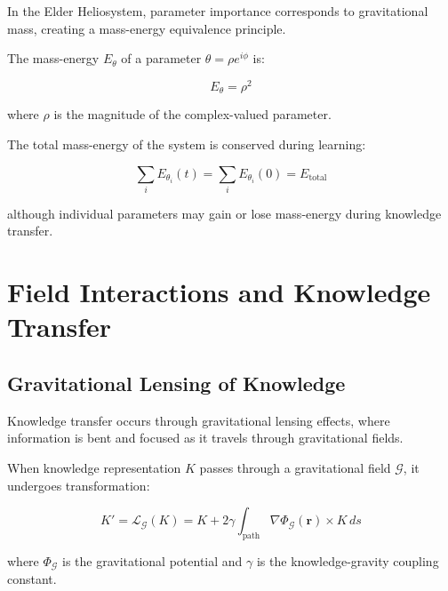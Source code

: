 In the Elder Heliosystem, parameter importance corresponds to gravitational mass, creating a mass-energy equivalence principle.

\begin{definition}
The mass-energy $E_{\theta}$ of a parameter $\theta = \rho e^{i\phi}$ is:

\begin{equation}
E_{\theta} = \rho^2
\end{equation}

where $\rho$ is the magnitude of the complex-valued parameter.
\end{definition}

\begin{theorem}
The total mass-energy of the system is conserved during learning:

\begin{equation}
\sum_{i} E_{\theta_i}(t) = \sum_{i} E_{\theta_i}(0) = E_{\text{total}}
\end{equation}

although individual parameters may gain or lose mass-energy during knowledge transfer.
\end{theorem}

\section{Field Interactions and Knowledge Transfer}

\subsection{Gravitational Lensing of Knowledge}

Knowledge transfer occurs through gravitational lensing effects, where information is bent and focused as it travels through gravitational fields.

\begin{theorem}
When knowledge representation $K$ passes through a gravitational field $\mathcal{G}$, it undergoes transformation:

\begin{equation}
K' = \mathcal{L}_{\mathcal{G}}(K) = K + 2\gamma \int_{\text{path}} \nabla \Phi_{\mathcal{G}}(\mathbf{r}) \times K \, ds
\end{equation}

where $\Phi_{\mathcal{G}}$ is the gravitational potential and $\gamma$ is the knowledge-gravity coupling constant.
\end{theorem}

